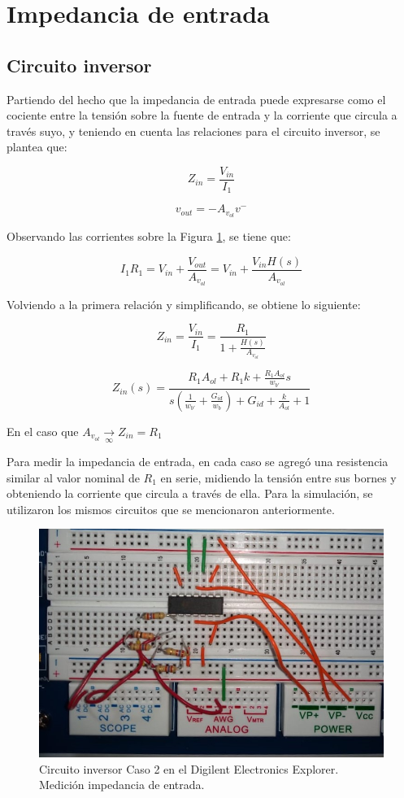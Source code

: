 \section{Impedancia de entrada}

\subsection{Circuito inversor}

Partiendo del hecho que la impedancia de entrada puede expresarse como el cociente entre la tensión sobre la fuente de entrada y la corriente que circula a través suyo, y teniendo en cuenta las relaciones para el circuito inversor, se plantea que:

$$Z_{in}=\frac{V_{in}}{I_{1}}$$

$$v_{out}=-A_{v_{ol}}v^{-}$$

Observando las corrientes sobre la Figura \ref{fig:circInv}, se tiene que:

$$I_{1}R_{1}=V_{in}+\frac{V_{out}}{A_{v_{ol}}}=V_{in}+\frac{V_{in}H(s)}{A_{v_{ol}}}$$

Volviendo a la primera relación y simplificando, se obtiene lo siguiente:

$$Z_{in}=\frac{V_{in}}{I_{1}}=\frac{R_{1}}{1+\frac{H(s)}{A_{v_{ol}}}}$$

\begin{equation} \label{eq:zin1}
	Z_{in}(s)=\frac{R_{1}A_{ol}+R_{1}k+\frac{R_{1}A_{ol}}{w_{b'}}s}{s(\frac{1}{w_{b'}}+\frac{G_{id}}{w_{b}})+G_{id}+\frac{k}{A_{ol}}+1}
\end{equation}

En el caso que $A_{v_{ol}}\underset{\infty }{\rightarrow} Z_{in}=R_{1}$

Para medir la impedancia de entrada, en cada caso se agregó una resistencia similar al valor nominal de $R_{1}$ en serie, midiendo la tensión entre sus bornes y obteniendo la corriente que circula a través de ella. Para la simulación, se utilizaron los mismos circuitos que se mencionaron anteriormente. 

\begin{figure}[H]
	\centering
	\includegraphics[scale=0.4]{./Imagenes/Inv2Zin.jpeg}
	\caption{Circuito inversor Caso 2 en el Digilent Electronics Explorer. Medición impedancia de entrada.}
	\label{fig:circInv}
\end{figure}

